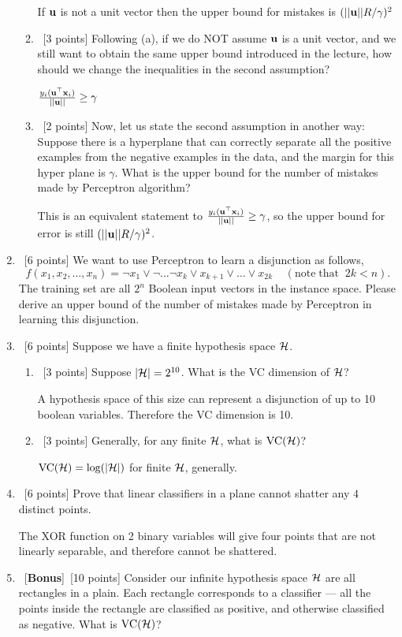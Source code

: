 \documentclass[12pt, fullpage,letterpaper]{article}
\begin{document}
\begin{enumerate}
\begin{enumerate}
		\bigskip
		If ${\bf u}$ is not a unit vector then the upper bound for mistakes is $(||{\bf u}||R/\gamma)^2$
		\bigskip
		\item~[3 points] Following (a), if we do NOT assume ${\bf u}$ is a unit vector, and we still want to obtain the same upper bound introduced in the lecture, how should we change the inequalities in the second assumption?
		
		\bigskip
		$\frac{y_i({\bf u}^\top {\bf x}_i)}{||{\bf u}||} \ge \gamma$
		\bigskip
		
		\item~[2 points]  Now, let us state the second assumption in another way: Suppose there is a hyperplane that can correctly separate all the positive examples from the negative examples in the data, and the margin for this hyper plane is $\gamma$. What is the upper bound for the number of mistakes made by Perceptron algorithm?
		
		\bigskip
		This is an equivalent statement to $\frac{y_i({\bf u}^\top {\bf x}_i)}{||{\bf u}||} \ge \gamma$, so the upper bound for error is still $(||{\bf u}||R/\gamma)^2$.
		
	\end{enumerate}
	
	\item~[6 points] We want to use Perceptron to learn a disjunction as follows,
	\[
	f(x_1, x_2, \ldots, x_n) = \neg x_1 \lor \neg \ldots \neg x_k \lor x_{k+1} \lor \ldots \lor x_{2k} \;\;\;\;(\mathrm{note\; that}\;\; 2k < n).
	\]
	The training set are all $2^n$ Boolean input vectors in the instance space. 
	Please derive an upper bound of the number of mistakes made by Perceptron in learning this disjunction.

	\item~[6 points] Suppose we have a finite hypothesis space $\mathcal{H}$.
	\begin{enumerate}
		\item~[3 points] Suppose $|\mathcal{H}| = 2^{10}$. What is the VC dimension of $\mathcal{H}$? 
		
		\bigskip
		A hypothesis space of this size can represent a disjunction of up to 10 boolean variables. Therefore the VC dimension is 10.
		\bigskip
		\item~[3 points] Generally, for  any finite $\mathcal{H}$, what is $\mathrm{VC}(\mathcal{H})$?
		
		\bigskip
		$\mathrm{VC}(\mathcal{H}) = \log(|\mathcal{H}|)$ for finite $\mathcal{H}$, generally.
	\end{enumerate}
	\item~[6 points] Prove that linear classifiers in a plane cannot shatter any $4$ distinct points. 
	
	\bigskip
	The XOR function on 2 binary variables will give four points that are not linearly separable, and therefore cannot be shattered.
	\bigskip
	\item~[\textbf{Bonus}]~[10 points] Consider our infinite hypothesis space $\mathcal{H}$ are all rectangles in a plain. Each rectangle corresponds to a classifier --- all the points inside the rectangle are classified as positive, and otherwise classified as negative. What is $\mathrm{VC}(\mathcal{H})$? 


\end{enumerate}
\end{document}
